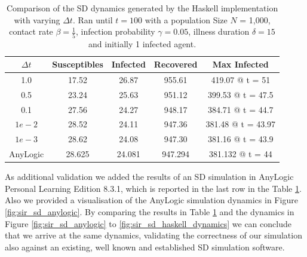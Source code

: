 \begin{table}
  \centering
  \begin{tabular}{ c || c | c | c | c }
    $\Delta t$ & Susceptibles & Infected & Recovered & Max Infected \\ \hline \hline 
    1.0 & 17.52 & 26.87 & 955.61 & 419.07 @ t = 51 \\ \hline
    0.5 & 23.24 & 25.63 & 951.12 & 399.53 @ t = 47.5 \\ \hline
    0.1 & 27.56 & 24.27 & 948.17 & 384.71 @ t = 44.7 \\ \hline
    $1e-2$ & 28.52 & 24.11 & 947.36 & 381.48 @ t = 43.97 \\ \hline
    $1e-3$ & 28.62 & 24.08 & 947.30 & 381.16 @ t = 43.9  \\ \hline \hline
    AnyLogic & 28.625 & 24.081 & 947.294 & 381.132 @ t = 44
    
  \end{tabular}
  \caption[Comparison of the SD dynamics generated by the Haskell implementation with varying $\Delta t$]{Comparison of the SD dynamics generated by the Haskell implementation with varying $\Delta t$. Ran until $t = 100$ with a population Size $N$ = 1,000, contact rate $\beta = \frac{1}{5}$, infection probability $\gamma = 0.05$, illness duration $\delta = 15$ and initially 1 infected agent.}
  \label{tab:delta_influence}
\end{table}

As additional validation we added the results of an SD simulation in AnyLogic Personal Learning Edition 8.3.1, which is reported in the last row in the Table \ref{tab:delta_influence}. Also we provided a visualisation of the AnyLogic simulation dynamics in Figure \ref{fig:sir_sd_anylogic}. By comparing the results in Table \ref{tab:delta_influence} and the dynamics in Figure \ref{fig:sir_sd_anylogic} to \ref{fig:sir_sd_haskell_dynamics} we can conclude that we arrive at the same dynamics, validating the correctness of our simulation also against an existing, well known and established SD simulation software.


